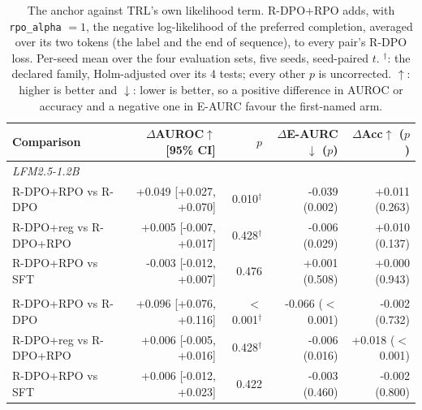 \begin{table}[t]
\centering
\caption{The anchor against TRL's own likelihood term. R-DPO+RPO adds, with \texttt{rpo\_alpha} $= 1$, the negative log-likelihood of the preferred completion, averaged over its two tokens (the label and the end of sequence), to every pair's R-DPO loss. Per-seed mean over the four evaluation sets, five seeds, seed-paired $t$. $^{\dagger}$: the declared family, Holm-adjusted over its 4 tests; every other $p$ is uncorrected. $\uparrow$: higher is better and $\downarrow$: lower is better, so a positive difference in AUROC or accuracy and a negative one in E-AURC favour the first-named arm.}
\label{tab:rpo}
\footnotesize
\setlength{\tabcolsep}{3pt}
\begin{tabular}{lrrrr}
\toprule
Comparison & $\Delta$AUROC$\uparrow$ [95\% CI] & $p$ & $\Delta$E-AURC$\downarrow$ ($p$) & $\Delta$Acc$\uparrow$ ($p$) \\
\midrule
\multicolumn{5}{l}{\textit{LFM2.5-1.2B}} \\
R-DPO+RPO vs R-DPO & +0.049 [+0.027, +0.070] & 0.010$^{\dagger}$ & -0.039 (0.002) & +0.011 (0.263) \\
R-DPO+reg vs R-DPO+RPO & +0.005 [-0.007, +0.017] & 0.428$^{\dagger}$ & -0.006 (0.029) & +0.010 (0.137) \\
R-DPO+RPO vs SFT & -0.003 [-0.012, +0.007] & 0.476 & +0.001 (0.508) & +0.000 (0.943) \\
\addlinespace
\multicolumn{5}{l}{\textit{Qwen3.5-2B}} \\
R-DPO+RPO vs R-DPO & +0.096 [+0.076, +0.116] & $<$0.001$^{\dagger}$ & -0.066 ($<$0.001) & -0.002 (0.732) \\
R-DPO+reg vs R-DPO+RPO & +0.006 [-0.005, +0.016] & 0.428$^{\dagger}$ & -0.006 (0.016) & +0.018 ($<$0.001) \\
R-DPO+RPO vs SFT & +0.006 [-0.012, +0.023] & 0.422 & -0.003 (0.460) & -0.002 (0.800) \\
\bottomrule
\end{tabular}
\end{table}
